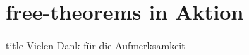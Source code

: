 \documentclass{beamer}
\begin{document}



\section{free-theorems in Aktion}
  
  
\begin{frame}
\vfill
\centering
\begin{beamercolorbox}[sep=8pt,center,shadow=true,rounded=true]{title}
Vielen Dank für die Aufmerksamkeit\par%
\end{beamercolorbox}
\vfill
\end{frame}
\end{document}
